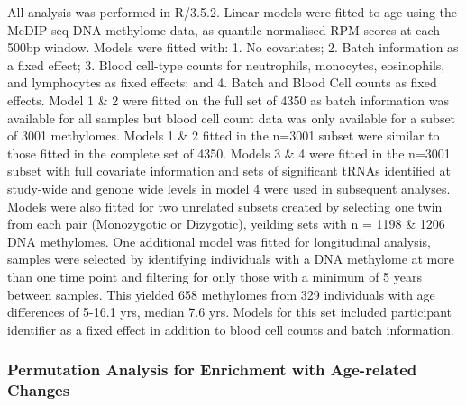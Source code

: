 \documentclass[
]{book}
\begin{document}
All analysis was performed in R/3.5.2.
Linear models were fitted to age using the MeDIP-seq DNA methylome data, as quantile normalised RPM scores at each 500bp window.
Models were fitted with: 1. No covariates; 2. Batch information as a fixed effect; 3. Blood cell-type counts for neutrophils, monocytes, eosinophils, and lymphocytes as fixed effects; and 4. Batch and Blood Cell counts as fixed effects.
Model 1 \& 2 were fitted on the full set of 4350 as batch information was available for all samples but blood cell count data was only available for a subset of 3001 methylomes.
Models 1 \& 2 fitted in the n=3001 subset were similar to those fitted in the complete set of 4350.
Models 3 \& 4 were fitted in the n=3001 subset with full covariate information and sets of significant tRNAs identified at study-wide and genone wide levels in model 4 were used in subsequent analyses.
Models were also fitted for two unrelated subsets created by selecting one twin from each pair (Monozygotic or Dizygotic), yeilding sets with n = 1198 \& 1206 DNA methylomes.
One additional model was fitted for longitudinal analysis, samples were selected by identifying individuals with a DNA methylome at more than one time point and filtering for only those with a minimum of 5 years between samples.
This yielded 658 methylomes from 329 individuals with age differences of 5-16.1 yrs, median 7.6 yrs.
Models for this set included participant identifier as a fixed effect in addition to blood cell counts and batch information.

\hypertarget{AgeErichmentPermutation}{%
\subsubsection{Permutation Analysis for Enrichment with Age-related Changes}\label{AgeErichmentPermutation}}
\end{document}
